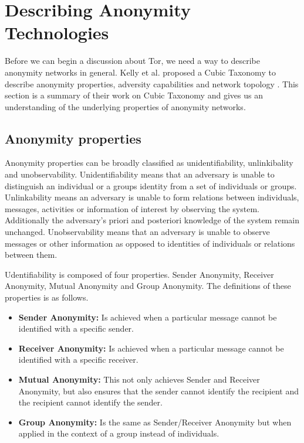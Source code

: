 \documentclass{llncs}
\begin{document}
\section{Describing Anonymity Technologies} \label{taxonomy}
Before we can begin a discussion about Tor,  we need a way to describe anonymity networks in general. Kelly et al. proposed a Cubic Taxonomy to describe anonymity properties, adversity capabilities and network topology \cite{kelly2012exploring}. This section is a summary of their work on Cubic Taxonomy and gives us an understanding of the underlying properties of anonymity networks.

\subsection{Anonymity properties}
Anonymity properties can be broadly classified as unidentifiability, unlinkibality and unobservability. Unidentifiability means that an adversary is unable to distinguish an individual or a groups identity from a set of individuals or groups. Unlinkability means an adversary is unable to form relations between individuals, messages, activities or information of interest by observing the system. Additionally the adversary's priori and posteriori knowledge of the system remain unchanged. Unobservability means that an adversary is unable to observe messages or other information as opposed to identities of individuals or relations between them.

Udentifiability is composed of four properties. Sender Anonymity, Receiver Anonymity, Mutual Anonymity and Group Anonymity. The definitions of these properties is as follows.
\begin{itemize}
\item[]{\textbf{Sender Anonymity:} Is achieved when a particular message cannot be identified with a specific sender.}
\item[]{\textbf{Receiver Anonymity:} Is achieved when a particular message cannot be identified with a specific receiver.}
\item[]{\textbf{Mutual Anonymity:} This not only achieves Sender and Receiver Anonymity, but also ensures that the sender cannot identify the recipient and the recipient cannot identify the sender.}
\item[]{\textbf{Group Anonymity:} Is the same as Sender/Receiver Anonymity but when applied in the context of a group instead of individuals.}
\end{itemize}
\end{document}
